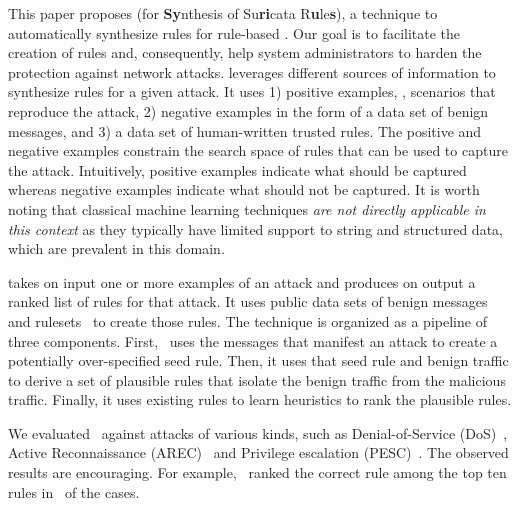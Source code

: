 \documentclass[conference]{IEEEtran}
\begin{document}
\sloppy This paper proposes \tname{} (for \textbf{Sy}nthesis of
Su\textbf{ri}cata R\textbf{u}le\textbf{s}), a technique to
automatically synthesize rules for rule-based \nids. Our goal is to
facilitate the creation of rules and, consequently, help system
administrators to harden the protection against network attacks.
\tname{} leverages different sources of information to synthesize
rules for a given attack. It uses 1) positive examples, \ie{},
scenarios that reproduce the attack, 2) negative examples in the form
of a data set of benign messages, and 3) a data set of human-written
trusted rules. The positive and negative examples constrain the search
space of rules that can be used to capture the attack. Intuitively,
positive examples indicate what should be captured whereas negative
examples indicate what should not be captured. It is worth noting that
classical machine learning techniques \emph{are not directly
  applicable in this context} as they typically have limited support
to string and structured data, which are prevalent in this domain.



\tname{} takes on input one or more examples  of an attack and produces
on output a ranked list of rules for that attack. It uses public data
sets of benign messages~\cite{tcpreplay,stratosphere-normal} and
rulesets~\cite{emerging-threats-open} to create those rules. The
technique is organized as a pipeline of three components. First,
\tname\ uses the messages that manifest an attack to create a
potentially over-specified seed rule. Then, it uses that seed rule and
benign traffic to derive a set of plausible rules that isolate the
benign traffic from the malicious traffic. Finally, it uses existing
rules to learn heuristics to rank the plausible rules.

We evaluated \tname\ against \totalAttacks attacks of various kinds, such as 
 Denial-of-Service (DoS)~\cite{denial-of-service},
Active Reconnaissance (AREC)~\cite{active-reconnaissance} and Privilege
escalation (PESC)~\cite{privilege-escalation}. %
The observed results are encouraging. For 
example, \tname\ ranked the correct rule among the top ten rules in 
\percTopFiveRanking\ of the cases. 
\end{document}
